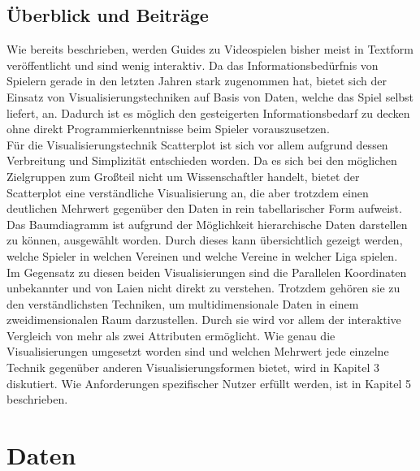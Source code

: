 \documentclass[usegeometry=true]{scrartcl}
\begin{document}
\subsection{Überblick und Beiträge}

Wie bereits beschrieben, werden Guides zu Videospielen bisher meist in Textform veröffentlicht und sind wenig interaktiv. Da das Informationsbedürfnis von Spielern gerade in den letzten Jahren stark zugenommen hat, bietet sich der Einsatz von Visualisierungstechniken auf Basis von Daten, welche das Spiel selbst liefert, an. Dadurch ist es möglich den gesteigerten Informationsbedarf zu decken ohne direkt Programmierkenntnisse beim Spieler vorauszusetzen.\\
Für die Visualisierungstechnik Scatterplot ist sich vor allem aufgrund dessen Verbreitung und Simplizität entschieden worden. Da es sich bei den möglichen Zielgruppen zum Großteil nicht um Wissenschaftler handelt, bietet der Scatterplot eine verständliche Visualisierung an, die aber trotzdem einen deutlichen Mehrwert gegenüber den Daten in rein tabellarischer Form aufweist.
Das Baumdiagramm ist aufgrund der Möglichkeit hierarchische Daten darstellen zu können, ausgewählt worden. Durch dieses kann übersichtlich gezeigt werden, welche Spieler in welchen Vereinen und welche Vereine in welcher Liga spielen.\\
Im Gegensatz zu diesen beiden Visualisierungen sind die Parallelen Koordinaten unbekannter und von Laien nicht direkt zu verstehen. Trotzdem gehören sie zu den verständlichsten Techniken, um multidimensionale Daten in einem zweidimensionalen Raum darzustellen. Durch sie wird vor allem der interaktive Vergleich von mehr als zwei Attributen ermöglicht. 
Wie genau die Visualisierungen umgesetzt worden sind und welchen Mehrwert jede einzelne Technik gegenüber anderen Visualisierungsformen bietet, wird in Kapitel 3 diskutiert. Wie Anforderungen spezifischer Nutzer erfüllt werden, ist in Kapitel 5 beschrieben.

\section{Daten}
\end{document}
